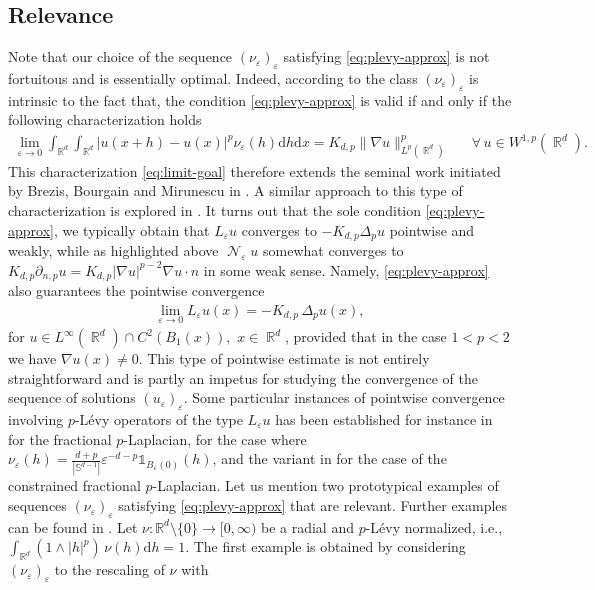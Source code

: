 \documentclass[12pt, reqno]{amsart}%
\theoremstyle{plain}  %
\theoremstyle{definition}  %
\numberwithin{equation}{section}
\DeclareMathOperator{\cN}{\mathcal{N}}
\DeclareMathOperator{\R}{\mathbb{R}}
\renewcommand{\d}{\mathrm{d}}
\newcommand{\eps}{\varepsilon}
\begin{document}
\subsection{Relevance}
\par Note that our choice of the sequence $(\nu_\eps)_\eps$ satisfying \eqref{eq:plevy-approx} is not fortuitous and is essentially optimal. Indeed, according to \cite[Theorem 9.6]{Fog25}  the class $(\nu_\eps)_\eps$ is intrinsic to the fact that, the condition \eqref{eq:plevy-approx} is valid if and only if the following characterization  holds
\begin{align}\label{eq:limit-goal}
\lim_{\eps\to0} \int_{\R^d} \int_{\R^d} |u(x+h)- u(x)|^p\nu_\eps(h)\d h\d x
=K_{d,p}\|\nabla u\|^p_{L^p(\R^d)}
&& \text{$\forall \, u\in W^{1,p}(\R^d)$}.
\end{align}
This characterization \eqref{eq:limit-goal} therefore extends the seminal work initiated by Brezis, Bourgain and Mirunescu in \cite{BBM01}.
A similar approach to this type of characterization is explored in \cite{DDP23,DDG24,GeSt26}. It turns out that the sole condition \eqref{eq:plevy-approx}, we typically obtain that $L_{\varepsilon} u$ converges to $-K_{d,p}\Delta_p u$ pointwise and weakly, while as highlighted above $\cN_{\varepsilon} u $ somewhat converges to $K_{d,p}\partial_{n,p} u= K_{d,p}|\nabla u|^{p-2}\nabla u\cdot n$ in some weak sense.  Namely,  \eqref{eq:plevy-approx} also guarantees the pointwise convergence
\begin{align*}
    \lim_{\varepsilon \to 0} L_{\varepsilon} u(x)
    = - K_{d,p}\, \Delta_p u(x),
\end{align*}
for $u \in L^\infty(\R^d) \cap C^2(B_1(x)),$ $ x \in \R^d$, provided that in the case $1<p<2$ we have $\nabla u(x) \neq 0$.
This type of pointwise estimate is not entirely straightforward and is partly an impetus for studying the convergence of the sequence of solutions $(u_\eps)_\eps$.
Some particular instances of pointwise convergence involving $p$-L\'evy operators of the type $L_\eps u$
has been established  for instance in
\cite[Theorem~2.8]{BS22} for the fractional $p$-Laplacian, \cite[Corollary~6.3]{dTL21} for the case where $\nu_\eps(h)= \tfrac{d+p}{|\mathbb{S}^{d-1}|} \eps^{-d-p}\mathds{1}_{B_\eps(0)}(h)$, and the variant in \cite[Section~7]{IN10} for the case of  the constrained fractional $p$-Laplacian. Let us mention two prototypical examples of sequences $(\nu_\eps)_\eps$ satisfying \eqref{eq:plevy-approx} that are relevant. Further examples can be found in \cite{Fog23, guy-thesis, FGKV20}. Let $\nu : \mathbb{R}^d \setminus \{0\} \to [0,\infty)$ be a radial and $p$-L\'evy normalized, i.e., $\int_{\R^d} (1 \wedge |h|^p)\, \nu(h)\d h = 1.$ The first example is obtained by considering $(\nu_{\eps})_{\eps}$ to the rescaling of  $\nu$  with
\end{document}
